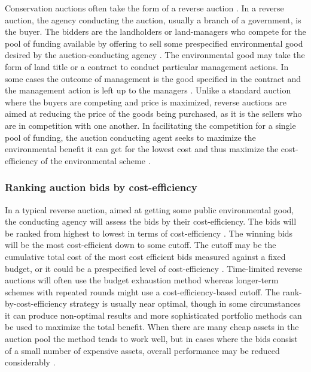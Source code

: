 \documentclass[]{article}
\theoremstyle{definition}
\theoremstyle{definition}
\theoremstyle{remark}
\begin{document}
Conservation auctions often take the form of a reverse auction
\citep[though sometimes conservation auctions are standard auctions see
e.g.,][]{Toth2013}. In a reverse auction, the agency conducting the
auction, usually a branch of a government, is the buyer. The bidders are
the landholders or land-managers who compete for the pool of funding
available by offering to sell some prespecified environmental good
desired by the auction-conducting agency \citep{Mcafee1987}. The
environmental good may take the form of land title or a contract to
conduct particular management actions. In some cases the outcome of
management is the good specified in the contract and the management
action is left up to the managers \citep{Hanley2014}. Unlike a standard
auction where the buyers are competing and price is maximized, reverse
auctions are aimed at reducing the price of the goods being purchased,
as it is the sellers who are in competition with one another. In
facilitating the competition for a single pool of funding, the auction
conducting agent seeks to maximize the environmental benefit it can get
for the lowest cost and thus maximize the cost-efficiency of the
environmental scheme \citep{Latacz1997}.

\subsubsection*{Ranking auction bids by
cost-efficiency}\label{ranking-auction-bids-by-cost-efficiency}

In a typical reverse auction, aimed at getting some public environmental
good, the conducting agency will assess the bids by their
cost-efficiency. The bids will be ranked from highest to lowest in terms
of cost-efficiency \citep{Stoneham2003}. The winning bids will be the
most cost-efficient down to some cutoff. The cutoff may be the
cumulative total cost of the most cost efficient bids measured against a
fixed budget, or it could be a prespecified level of cost-efficiency
\citep{Latacz1997}. Time-limited reverse auctions will often use the
budget exhaustion method whereas longer-term schemes with repeated
rounds might use a cost-efficiency-based cutoff. The
rank-by-cost-efficiency strategy is usually near optimal, though in some
circumstances it can produce non-optimal results and more sophisticated
portfolio methods can be used to maximize the total benefit. When there
are many cheap assets in the auction pool the method tends to work well,
but in cases where the bids consist of a small number of expensive
assets, overall performance may be reduced considerably
\citep{Hajkowicz2007}.
\end{document}
